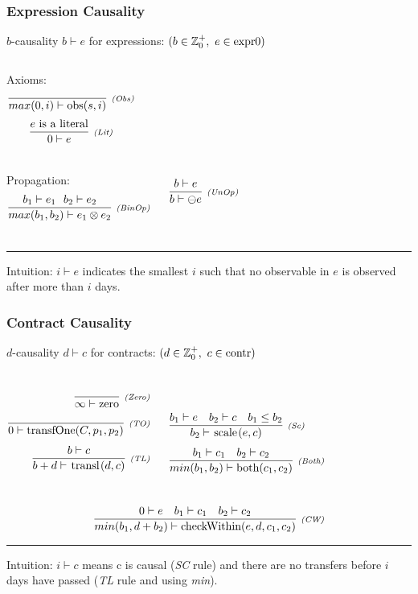 \documentclass[xcolor=dvipsnames,11pt]{beamer}
\newcommand{\comment}[2]{{\tiny \color{Orange}{$\spadesuit${\bf #1: }{\sf #2}$\spadesuit$}}}
\newcommand{\jbcomment}[1]{\comment{JB}{#1}}
\renewcommand{\emph}[1]{\textcolor{structure!90}{#1}}
\newcommand{\ttt}[1]{\mbox{\cd{#1}}}
\newcommand{\zero}{\ttt{zero}}
\newcommand{\transfOne}{\ttt{transfOne}}
\newcommand{\scale}{\ttt{scale}}
\newcommand{\transl}{\ttt{transl}}
\newcommand{\both}{\ttt{both}}
\newcommand{\checkWithin}{\ttt{checkWithin}}
\begin{document}
\begin{frame}
    \frametitle{Expression Causality}

\emph{$b$-causality} $ b \vdash e$ for \emph{expressions}:
{\scriptsize $ (b \in \mathbb{Z}_0^+, \ e \in \ttt{expr0})$}

\begin{columns}
\emph{Axioms:}
$$\crule{(Obs)}{}{max(0,i) \vdash \ttt{obs}(s,i)}$$
$$\crule{(Lit)}{e \mbox{ is a literal}}{0 \vdash e}$$
\end{columns}


\begin{columns}
\emph{Propagation:}
$$\crule{(BinOp)}{b_1 \vdash e_1\ \ b_2 \vdash e_2 }{max(b_1,b_2) \vdash e_1 \otimes e_2}$$

$$\crule{(UnOp)}{b \vdash e}{b \vdash \ominus e}$$
\end{columns}

\medskip
\hrule
\medskip

\emph{Intuition:} $i \vdash e$ indicates the smallest $i$ such that no observable in $e$ is observed \emph{after more than $i$ days}.

\end{frame}

\begin{frame}[t]
    \frametitle{Contract Causality}

\emph{$d$-causality} $ d \vdash c$ for contracts:
{\scriptsize $ (d \in \mathbb{Z}_0^+, \ c \in \ttt{contr})$}

\begin{columns}
\begin{align*}
\crule{(Zero)}{}{\infty \vdash \zero}&\\[1ex]
\crule{(TO)}{}{0 \vdash \transfOne(C,p_1,p_2)}&\\[1ex]
\crule{(TL)}{b \vdash c}{b + d \vdash \transl(d,c)}&\\[1ex]
\end{align*}

\begin{align*}
&\\[1ex]
&\crule{(Sc)}{b_1 \vdash e\ \ \ b_2\vdash c\ \ \ b_1 \leq b_2 }{b_2 \vdash \scale(e,c)}\\[1ex]
&\crule{(Both)}{b_1 \vdash c_1\ \ \ b_2 \vdash c_2}{min(b_1,b_2) \vdash \both(c_1,c_2)}%
\end{align*}
\end{columns}
$$ 
\crule{(CW)}{0\vdash e\ \ \ b_1 \vdash c_1\ \ \ b_2 \vdash c_2}{min(b_1,d+b_2) \vdash \checkWithin(e,d,c_1,c_2)}
$$

\medskip
\hrule
\medskip

\emph{Intuition:} $i \vdash c$ means c is causal (\textit{SC} rule) and there are no transfers before $i$ days have passed (\textit{TL} rule and using \textit{min}).

\end{frame}
\end{document}
